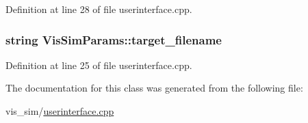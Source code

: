 Definition at line 28 of file userinterface.cpp.

\hypertarget{classVisSimParams_a225b522f1b7e0e07bb3745456693d84d}{
\subsubsection[{target\_\-filename}]{\setlength{\rightskip}{0pt plus 5cm}string {\bf VisSimParams::target\_\-filename}}}
\label{classVisSimParams_a225b522f1b7e0e07bb3745456693d84d}


Definition at line 25 of file userinterface.cpp.



The documentation for this class was generated from the following file:\begin{DoxyCompactItemize}
\item 
vis\_\-sim/\hyperlink{userinterface_8cpp}{userinterface.cpp}\end{DoxyCompactItemize}
